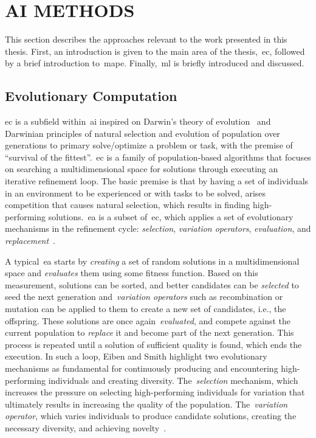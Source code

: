 \section{AI METHODS}  \normalfont

This section describes the approaches relevant to the work presented in this thesis. First, an introduction is given to the main area of the thesis,~\acrfull{ec}, followed by a brief introduction to~\acrshort{mape}. Finally,~\acrfull{ml} is briefly introduced and discussed.



\subsection{Evolutionary Computation}

\acrfull{ec} is a subfield within~\acrshort{ai} inspired on Darwin's theory of evolution~\cite{darwin_origin_1859} and Darwinian principles of natural selection and evolution of population over generations to primary solve/optimize a problem or task, with the premise of ``survival of the fittest''.~\acrshort{ec} is a family of population-based algorithms that focuses on searching a multidimensional space for solutions through executing an iterative refinement loop. The basic premise is that by having a set of individuals in an environment to be experienced or with tasks to be solved, arises competition that causes natural selection, which results in finding high-performing solutions.~\acrfull{ea} is a subset of~\acrshort{ec}, which applies a set of evolutionary mechanisms in the refinement cycle: \textit{selection}, \textit{variation operators}, \textit{evaluation}, and \textit{replacement}~\cite{eiben_introduction_2007}.

A typical~\acrshort{ea} starts by \emph{creating} a set of random solutions in a multidimensional space and \emph{evaluates} them using some fitness function. Based on this measurement, solutions can be sorted, and better candidates can be \emph{selected} to seed the next generation and~\emph{variation operators} such as recombination or mutation can be applied to them to create a new set of candidates, i.e., the offspring. These solutions are once again~\emph{evaluated}, and compete against the current population to \emph{replace} it and become part of the next generation. This process is repeated until a solution of sufficient quality is found, which ends the execution. In such a loop, Eiben and Smith highlight two evolutionary mechanisms as fundamental for continuously producing and encountering high-performing individuals and creating diversity. The~\emph{selection} mechanism, which increases the pressure on selecting high-performing individuals for variation that ultimately results in increasing the quality of the population. The~\emph{variation operator}, which varies individuals to produce candidate solutions, creating the necessary diversity, and achieving novelty~\cite{eiben_introduction_2007}. 

